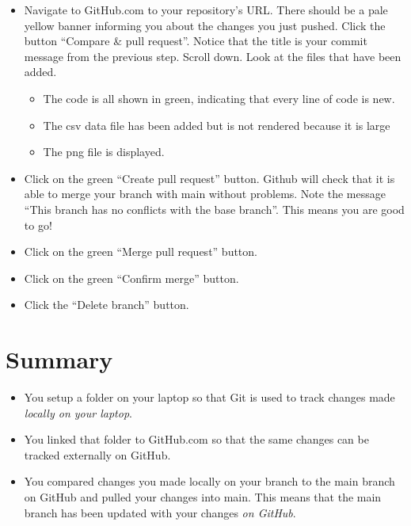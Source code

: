 \documentclass[
]{book}
\providecommand{\tightlist}{%
  \setlength{\itemsep}{0pt}\setlength{\parskip}{0pt}}
\begin{document}
\begin{itemize}
\tightlist
\item
  Navigate to GitHub.com to your repository's URL. There should be a pale yellow
  banner informing you about the changes you just pushed. Click the button
  ``Compare \& pull request''. Notice that the title is your commit message from the
  previous step. Scroll down. Look at the files that have been added.

  \begin{itemize}
  \tightlist
  \item
    The code is all shown in green, indicating that every line of code is new.
  \item
    The csv data file has been added but is not rendered because it is large
  \item
    The png file is displayed.
  \end{itemize}
\item
  Click on the green ``Create pull request'' button. Github will check that it
  is able to merge your branch with main without problems. Note the message ``This
  branch has no conflicts with the base branch''. This means you are good to go!
\item
  Click on the green ``Merge pull request'' button.\\
\item
  Click on the green ``Confirm merge'' button.
\item
  Click the ``Delete branch'' button.
\end{itemize}

\hypertarget{summary}{%
\section{Summary}\label{summary}}

\begin{itemize}
\tightlist
\item
  You setup a folder on your laptop so that Git is used to track changes made
  \emph{locally on your laptop}.
\item
  You linked that folder to GitHub.com so that the same changes can be tracked
  externally on GitHub.
\item
  You compared changes you made locally on your branch to the main branch on
  GitHub and pulled your changes into main. This means that the main branch has
  been updated with your changes \emph{on GitHub}.
\end{itemize}
\end{document}
